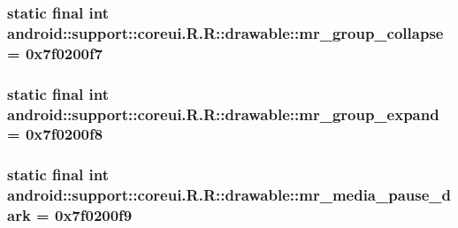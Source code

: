 \hypertarget{classandroid_1_1support_1_1coreui_1_1_r_1_1drawable_1dbfb5b705dc781d8be904f19e2b6821}{
\subsubsection[{mr\_\-group\_\-collapse}]{\setlength{\rightskip}{0pt plus 5cm}static final int android::support::coreui.R.R::drawable::mr\_\-group\_\-collapse = 0x7f0200f7}}
\label{classandroid_1_1support_1_1coreui_1_1_r_1_1drawable_1dbfb5b705dc781d8be904f19e2b6821}


\hypertarget{classandroid_1_1support_1_1coreui_1_1_r_1_1drawable_559854866f66d5ae5d7e664532126a4e}{
\subsubsection[{mr\_\-group\_\-expand}]{\setlength{\rightskip}{0pt plus 5cm}static final int android::support::coreui.R.R::drawable::mr\_\-group\_\-expand = 0x7f0200f8}}
\label{classandroid_1_1support_1_1coreui_1_1_r_1_1drawable_559854866f66d5ae5d7e664532126a4e}


\hypertarget{classandroid_1_1support_1_1coreui_1_1_r_1_1drawable_db7ee7a766fbff6e6e672028d9cf3e7d}{
\subsubsection[{mr\_\-media\_\-pause\_\-dark}]{\setlength{\rightskip}{0pt plus 5cm}static final int android::support::coreui.R.R::drawable::mr\_\-media\_\-pause\_\-dark = 0x7f0200f9}}
\label{classandroid_1_1support_1_1coreui_1_1_r_1_1drawable_db7ee7a766fbff6e6e672028d9cf3e7d}


